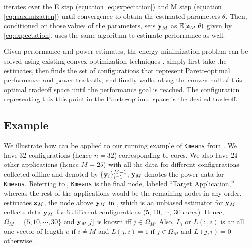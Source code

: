 
\SYSTEMLEO{} iterates over the E step (equation \eqref{eq:expectation})
and M step (equation \eqref{eq:maximization}) until convergence to
obtain the estimated parameters $\theta$. Then, conditioned on those
values of the parameters, \SYSTEMLEO{} sets $\mathbf{y}_M$ as $\mathbb{E}(\mathbf{z}_M | \theta)$
given by \eqref{eq:expectation}. \SYSTEMLEO{} uses the same algorithm to
estimate performance as well.

Given performance and power estimates, the energy minimization problem
can be solved using existing convex optimization techniques
\cite{PTRADE,ControlWare,Agilos,Heartbeats2}.  \SYSTEMLEO{} simply first
take the estimates, then finds the set of configurations that
represent Pareto-optimal performance and power tradeoffs, and finally
walks along the convex hull of this optimal tradeoff space until the
performance goal is reached.  The configuration representing this this
point in the Pareto-optimal space is the desired tradeoff.

\subsection{Example}
We illustrate how \SYSTEMLEO{} can be applied to our running example of
\texttt{Kmeans} from . We have 32 configurations
(hence $n=32$) corresponding to cores. We also have 24 other
applications (hence $M = 25$) with all the data for different
configurations collected offline and denoted by
$\{\mathbf{y}_i\}_{i=1}^{M-1}$; $\mathbf{y}_M$ denotes the power data for
\texttt{Kmeans}. Referring to , \texttt{Kmeans} is the
final node, labeled ``Target Application,'' whereas the rest of the
applications would be the remaining nodes in any order. \SYSTEMLEO{}
estimates $\mathbf{z}_M$, the node above $\mathbf{y}_M$ in , which is
an unbiased estimator for $\mathbf{y}_M$. \SYSTEMLEO{} collects data $\mathbf{y}_M$ for 6
different configurations (5, 10, $\cdots$, 30 cores). Hence, $\Omega_M
= \{5, 10, \cdots, 30 \}$ and $\mathbf{y}_M[j]$ is known iff $j \in \Omega_M$.
Also, $L_i$ or $L(:,i)$ is an all one vector of length $n$ if $i \neq
M$ and $L(j,i) = 1 \text{ if } j \in \Omega_M$ and $L(j,i) = 0$
otherwise.

